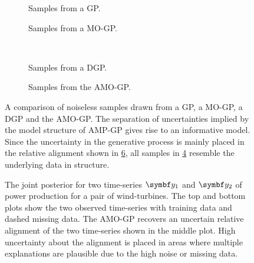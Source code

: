 \begin{figure}[t]
    \centering
    \begin{subfigure}[b]{\halffigurewidth}
        \centering
        \caption{
            \label{fig:alignment:wind_samples:a}
            Samples from a GP.
        }
    \end{subfigure}
    \hfill
    \begin{subfigure}[b]{\halffigurewidth}
        \centering
        \caption{
            \label{fig:alignment:wind_samples:b}
            Samples from a MO-GP.
        }
    \end{subfigure}\\[\figureskip]
    \begin{subfigure}[b]{\halffigurewidth}
        \centering
        \caption{
            \label{fig:alignment:wind_samples:c}
            Samples from a DGP.
        }
    \end{subfigure}
    \hfill
    \begin{subfigure}[b]{\halffigurewidth}
        \centering
        \caption{
            \label{fig:alignment:wind_samples:d}
            Samples from the AMO-GP.
        }
    \end{subfigure}
    \caption[Comparison of samples from wind-turbine models]{
        \label{fig:alignment:wind_samples}
        A comparison of noiseless samples drawn from a GP, a MO-GP, a DGP and the AMO-GP.
        The separation of uncertainties implied by the model structure of AMP-GP gives rise to an informative model.
        Since the uncertainty in the generative process is mainly placed in the relative alignment shown in \cref{fig:alignment:wind_joint_model}, all samples in \cref{fig:alignment:wind_samples:d} resemble the underlying data in structure.
    }
\end{figure}
\begin{figure}[tp]
    \centering
    \caption[Wind-turbine experiment]{
        \label{fig:alignment:wind_joint_model}
        The joint posterior for two time-series $\rv{y}_1$ and $\rv{y}_2$ of power production for a pair of wind-turbines.
        The top and bottom plots show the two observed time-series with training data and dashed missing data.
        The AMO-GP recovers an uncertain relative alignment of the two time-series shown in the middle plot.
        High uncertainty about the alignment is placed in areas where multiple explanations are plausible due to the high noise or missing data.
    }
\end{figure}
